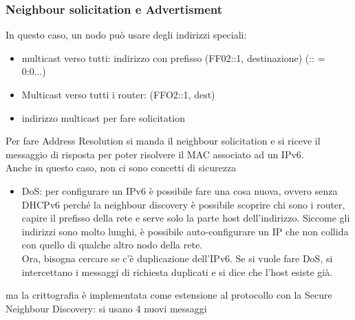 \documentclass[12pt, oneside]{extbook} %
\begin{document}
\subsubsection{Neighbour solicitation e Advertisment}
In questo caso, un nodo può usare degli indirizzi speciali:
\begin{itemize}
\item multicast verso tutti: indirizzo con prefisso (FF02::1, destinazione) (:: = 0:0...)
\item Multicast verso tutti i router: (FFO2::1, dest)
\item indirizzo multicast per fare solicitation
\end{itemize}
Per fare Address Resolution si manda il neighbour solicitation e si riceve il messaggio di risposta per poter risolvere il MAC associato ad un IPv6.\\ Anche in questo caso, non ci sono concetti di sicurezza 
\begin{itemize}
\item DoS: per configurare un IPv6 è possibile fare una cosa nuova, ovvero senza DHCPv6 perché la neighbour discovery è possibile scoprire chi sono i router, capire il prefisso della rete e serve solo la parte host dell'indirizzo. Siccome gli indirizzi sono molto lunghi, è possibile auto-configurare un IP che non collida con quello di qualche altro nodo della rete.\\ Ora, bisogna cercare se c'è duplicazione dell'IPv6. Se si vuole fare DoS, si intercettano i messaggi di richiesta duplicati e si dice che l'host esiste già.
\end{itemize}
ma la crittografia è implementata come estensione al protocollo con la Secure Neighbour Discovery: si usano 4 nuovi messaggi
\end{document}
